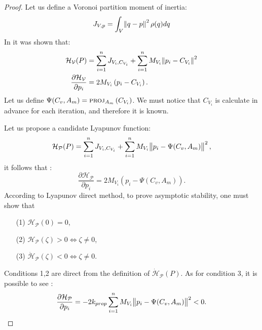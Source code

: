 \documentclass{iacas}
\begin{document}
\begin{proof}
Let us define a Voronoi partition moment of inertia:
\begin{equation}
J_{V,p} = \int_V \norm{q-p}^2 \rho(q)dq
\end{equation}
In \cite{Cortes2004} it was shown that:
\begin{align*}
\mathcal{H}_{\mathcal{V}}(P) &= \sum_{i=1}^n J_{V_i,C_{V_i}} + \sum_{i=1}^n M_{V_i} \norm{p_i - C_{V_i}}^2\\
\frac{\partial \mathcal{H}_{\mathcal{V}}}{\partial p_i} &= 2M_{V_i}\left( p_i - C_{V_i} \right).
\end{align*}
Let us define $\Psi(C_v, A_m) = \textsc{proj}_{A_m}\left( C_{V_{i}} \right)$. We must notice that $C_{V_i}$ is calculate in advance for each iteration, and therefore it is known.

Let us propose a candidate Lyapunov function:
\begin{equation}
\mathcal{\mathcal{H}_{\mathcal{P}}}(P) = \sum_{i=1}^n J_{V_i,C_{V_i}} + \sum_{i=1}^n M_{V_i} \norm{p_i - \Psi(C_v, A_m)}^2,
\end{equation}
it follows that \cite{Cortes2004}:
\begin{equation}
\frac{\partial \mathcal{H}_{\mathcal{P}}}{\partial p_i} = 2M_{V_i}\left( p_i - \Psi(C_v, A_m) \right).
\end{equation}
According to Lyapunov direct method, to prove asymptotic stability, one must show that
    \begin{itemize}
        \item[(1)] $\mathcal{\mathcal{H}_{\mathcal{P}}}(0) = 0$,
        \item[(2)] $\mathcal{\mathcal{H}_{\mathcal{P}}}(\zeta) > 0 \Leftrightarrow \zeta \neq 0$,
        \item[(3)] $\dot{{\mathcal{H}}}_{\mathcal{P}}(\zeta) < 0 \Leftrightarrow \zeta \neq 0$.
    \end{itemize}
Conditions 1,2 are direct from the definition of  $\dot{\mathcal{\mathcal{H}}}_{\mathcal{P}}(P)$.
As for condition 3, it is possible to see \cite{Cortes2004}:
\begin{equation*}
\frac{\partial \mathcal{H}_{\mathcal{P}}}{\partial p_i} = -2k_{prop} \sum_{i=1}^n M_{V_i} \norm{p_i - \Psi(C_v, A_m)}^2 < 0.
\end{equation*}
\end{proof}
\end{document}
